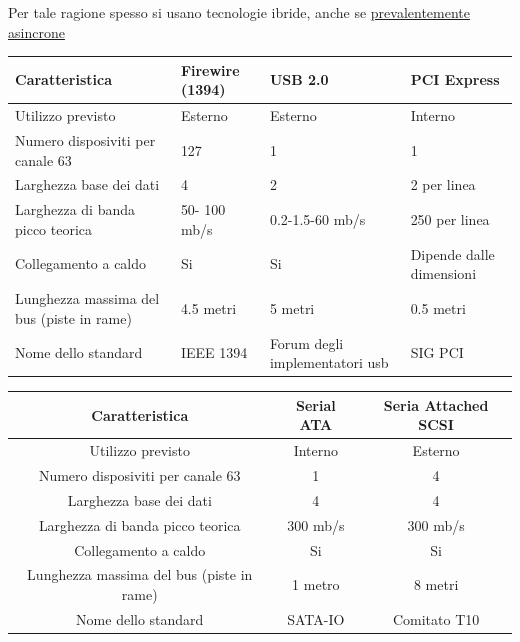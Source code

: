 Per tale ragione spesso si usano tecnologie ibride, anche se \underline{prevalentemente asincrone}
\begin{center}
	\begin{tabular}{|m{}|m{}|m{}|m{}|}
		\hline
		Caratteristica                            & Firewire (1394) & USB 2.0                        & PCI Express              \\
		\hline
		Utilizzo previsto                         & Esterno         & Esterno                        & Interno                  \\[22pt]
		Numero disposiviti per canale 63          & 127             & 1                              & 1                        \\[22pt]
		Larghezza base dei dati                   & 4               & 2                              & 2 per linea              \\[22pt]
		Larghezza di banda picco teorica          & 50- 100 mb/s    & 0.2-1.5-60 mb/s                & 250 per linea            \\[22pt]
		Collegamento a caldo                      & Si              & Si                             & Dipende dalle dimensioni \\[22pt]
		Lunghezza massima del bus (piste in rame) & 4.5 metri       & 5 metri                        & 0.5 metri                \\[22pt]
		Nome dello standard                       & IEEE 1394       & Forum degli implementatori usb & SIG PCI                  \\[22pt]
		\hline
	\end{tabular}
	\vskip3mm
	\begin{tabular}{|c|c|c|}
		\hline
		Caratteristica                            & Serial ATA & Seria Attached SCSI \\
		\hline
		Utilizzo previsto                         & Interno    & Esterno             \\
		Numero disposiviti per canale 63          & 1          & 4                   \\
		Larghezza base dei dati                   & 4          & 4                   \\
		Larghezza di banda picco teorica          & 300 mb/s   & 300 mb/s            \\
		Collegamento a caldo                      & Si         & Si                  \\
		Lunghezza massima del bus (piste in rame) & 1 metro    & 8 metri             \\
		Nome dello standard                       & SATA-IO    & Comitato T10        \\
		\hline
	\end{tabular}
\end{center}
